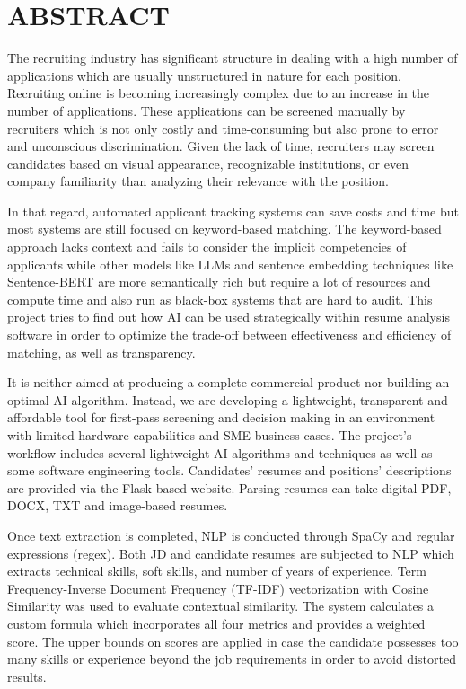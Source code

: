\chapter*{ABSTRACT}

The recruiting industry has significant structure in dealing with a high number of applications which are usually unstructured in nature for each position. Recruiting online is becoming increasingly complex due to an increase in the number of applications. These applications can be screened manually by recruiters which is not only costly and time-consuming but also prone to error and unconscious discrimination. Given the lack of time, recruiters may screen candidates based on visual appearance, recognizable institutions, or even company familiarity than analyzing their relevance with the position.

In that regard, automated applicant tracking systems can save costs and time but most systems are still focused on keyword-based matching. The keyword-based approach lacks context and fails to consider the implicit competencies of applicants while other models like LLMs and sentence embedding techniques like Sentence-BERT are more semantically rich but require a lot of resources and compute time and also run as black-box systems that are hard to audit. This project tries to find out how AI can be used strategically within resume analysis software in order to optimize the trade-off between effectiveness and efficiency of matching, as well as transparency.

It is neither aimed at producing a complete commercial product nor building an optimal AI algorithm. Instead, we are developing a lightweight, transparent and affordable tool for first-pass screening and decision making in an environment with limited hardware capabilities and SME business cases. The project's workflow includes several lightweight AI algorithms and techniques as well as some software engineering tools. Candidates' resumes and positions' descriptions are provided via the Flask-based website. Parsing resumes can take digital PDF, DOCX, TXT and image-based resumes.

Once text extraction is completed, NLP is conducted through SpaCy and regular expressions (regex). Both JD and candidate resumes are subjected to NLP which extracts technical skills, soft skills, and number of years of experience. Term Frequency-Inverse Document Frequency (TF-IDF) vectorization with Cosine Similarity was used to evaluate contextual similarity. The system calculates a custom formula which incorporates all four metrics and provides a weighted score. The upper bounds on scores are applied in case the candidate possesses too many skills or experience beyond the job requirements in order to avoid distorted results.


